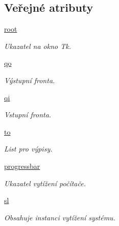 \subsection*{Veřejné atributy}
\begin{DoxyCompactItemize}
\item 
\hypertarget{classmnRepair_1_1App_a6625cd61e8f5be57f55b7b665d74e371}{\hyperlink{classmnRepair_1_1App_a6625cd61e8f5be57f55b7b665d74e371}{root}}\label{da/ddf/classmnRepair_1_1App_a6625cd61e8f5be57f55b7b665d74e371}

\begin{DoxyCompactList}\small\item\em Ukazatel na okno Tk. \end{DoxyCompactList}\item 
\hypertarget{classmnRepair_1_1App_aedba5e2d1f8af4e1ea8cb8fae90c5beb}{\hyperlink{classmnRepair_1_1App_aedba5e2d1f8af4e1ea8cb8fae90c5beb}{qo}}\label{da/ddf/classmnRepair_1_1App_aedba5e2d1f8af4e1ea8cb8fae90c5beb}

\begin{DoxyCompactList}\small\item\em Výstupní fronta. \end{DoxyCompactList}\item 
\hypertarget{classmnRepair_1_1App_a1892b820ecae78b8c38f303009f8c257}{\hyperlink{classmnRepair_1_1App_a1892b820ecae78b8c38f303009f8c257}{qi}}\label{da/ddf/classmnRepair_1_1App_a1892b820ecae78b8c38f303009f8c257}

\begin{DoxyCompactList}\small\item\em Vstupní fronta. \end{DoxyCompactList}\item 
\hypertarget{classmnRepair_1_1App_ab7bc6c2c656a8c1be4f02456279b4b0d}{\hyperlink{classmnRepair_1_1App_ab7bc6c2c656a8c1be4f02456279b4b0d}{to}}\label{da/ddf/classmnRepair_1_1App_ab7bc6c2c656a8c1be4f02456279b4b0d}

\begin{DoxyCompactList}\small\item\em List pro výpisy. \end{DoxyCompactList}\item 
\hypertarget{classmnRepair_1_1App_a60bf34e480b9e94fbc42c14033f5ab6e}{\hyperlink{classmnRepair_1_1App_a60bf34e480b9e94fbc42c14033f5ab6e}{progressbar}}\label{da/ddf/classmnRepair_1_1App_a60bf34e480b9e94fbc42c14033f5ab6e}

\begin{DoxyCompactList}\small\item\em Ukazatel vytížení počítače. \end{DoxyCompactList}\item 
\hypertarget{classmnRepair_1_1App_af80db154ea45d463c153b24e58fadb8b}{\hyperlink{classmnRepair_1_1App_af80db154ea45d463c153b24e58fadb8b}{sl}}\label{da/ddf/classmnRepair_1_1App_af80db154ea45d463c153b24e58fadb8b}

\begin{DoxyCompactList}\small\item\em Obsahuje instanci vytížení systému. \end{DoxyCompactList}\end{DoxyCompactItemize}


